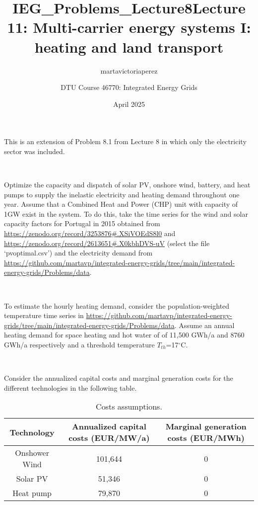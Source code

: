 \documentclass[10pt]{article}
\title{IEG_Problems_Lecture8}
\author{martavictoriaperez }
\date{April 2025}
\newenvironment{problem}[2][Problem]{\begin{trivlist}
\item[\hskip \labelsep {\bfseries #1}\hskip \labelsep {\bfseries #2.}]}{\end{trivlist}}
\begin{document}
 
\title{\textbf{Lecture 11: Multi-carrier energy systems I: heating and land transport}}
\author{DTU Course 46770: Integrated Energy Grids }
\maketitle

\begin{problem}{11.1}

This is an extension of Problem 8.1 from Lecture 8 in which only the electricity sector was included.

\

Optimize the capacity and dispatch of solar PV, onshore wind, battery, and heat pumps to supply the inelastic electricity and heating demand throughout one year. Assume that a Combined Heat and Power (CHP) unit with capacity of 1GW exist in the system. To do this, take the time series for the wind and solar capacity factors for Portugal in 2015 obtained from \url{https://zenodo.org/record/3253876#.XSiVOEdS8l0}
and \url{https://zenodo.org/record/2613651#.X0kbhDVS-uV} (select the file ‘pvoptimal.csv’) and the electricity demand from \url{https://github.com/martavp/integrated-energy-grids/tree/main/integrated-energy-grids/Problems/data}.

\

To estimate the hourly heating demand, consider the population-weighted temperature time series in \url{https://github.com/martavp/integrated-energy-grids/tree/main/integrated-energy-grids/Problems/data}. Assume an annual heating demand for space heating and hot water of of 11,500 GWh/a and 8760 GWh/a respectively and a threshold temperature $T_{th}$=17$^{\circ}$C.

\

Consider the annualized capital costs and marginal generation costs for the different technologies in the following table. 

\begin{table}[h]
    \centering
    \begin{tabular}{ccc}
    \hline
        Technology & Annualized capital costs (EUR/MW/a) & Marginal generation costs (EUR/MWh) \\
    \hline
    Onshower Wind &  101,644 & 0 \\
         Solar PV &  51,346 & 0 \\
         Heat pump & 79,870 &  0  \\
    \hline
    \end{tabular}
    \caption{Costs assumptions.}
    \label{tab:my_label}
\end{table}


\end{problem}
\end{document}
